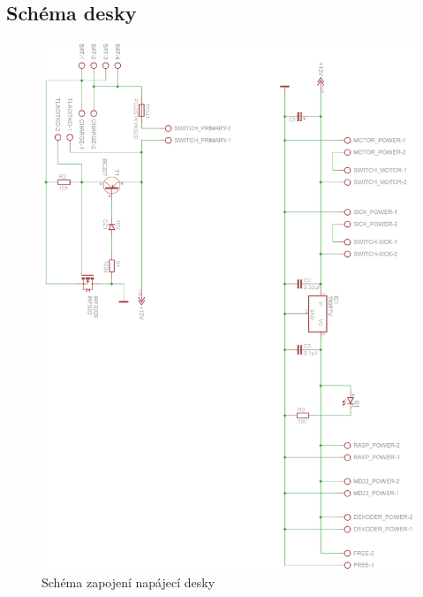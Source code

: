 \documentclass[a4paper,11pt]{article}
\begin{document}
\newpage
\subsection{Schéma desky}
\begin{figure}[ht]
	\centering
		\includegraphics[scale=0.65]{napajeniMobSchema.png}
	\caption{Schéma zapojení napájecí desky}
	\label{fig:napajeniMobSchema}
\end{figure}
\end{document}
